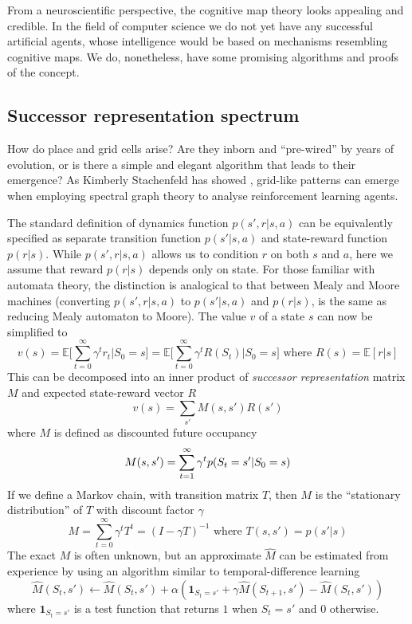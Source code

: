 \documentclass[oneside,english,logo]{amuthesis}
\begin{document}
From a neuroscientific perspective, the cognitive map theory looks appealing and credible. In the field of computer science we do not yet have any successful artificial agents, whose intelligence would be based on mechanisms resembling cognitive maps. We do, nonetheless, have some promising algorithms and proofs of the concept. 


\subsection{Successor representation spectrum}
How do place and grid cells arise? Are they inborn and ``pre-wired'' by years of evolution, or is there a simple and elegant algorithm that leads to their emergence? 
As Kimberly Stachenfeld has showed \cite{hipp_as_cog_map}, grid-like patterns can emerge when employing spectral graph theory to analyse reinforcement learning agents. 

The standard definition of dynamics function $p(s',r|s,a)$ can be equivalently specified as separate transition function $p(s'|s,a)$ and state-reward function $p(r|s)$.
While $p(s',r|s,a)$ allows us to condition $r$ on both $s$ and $a$,  here we assume that reward $p(r|s)$ depends only on state. For those familiar with automata theory, the distinction is analogical to that between Mealy and Moore machines (converting $p(s',r|s,a)$ to $p(s'|s,a)$ and $p(r|s)$, is the same as reducing Mealy automaton to Moore). The value $v$ of a state $s$ can now be simplified to
\[
v(s) = \mathbb{E}\big[\sum_{t=0}^\infty \gamma^t r_t\big\vert S_0=s\big] = \mathbb{E}\big[\sum_{t=0}^\infty \gamma^t R(S_t)\big\vert S_0=s\big]\text{ where }R(s)=\mathbb{E}[r|s]
\]
This can be decomposed into an inner product of \textit{successor representation} matrix $M$ and expected state-reward vector $R$
\[
v(s) = \sum_{s'} M(s,s') R(s')
\]
where $M$ is defined as discounted future occupancy
\[
M(s,s') = \sum_{t=1}^\infty \gamma ^t p(S_t=s'|S_0=s) \\
\]
If we define a Markov chain, with transition matrix $T$, then $M$ is the ``stationary distribution'' of $T$ with discount factor $\gamma$
\[
M = \sum_{t=0}^\infty \gamma^t T^t = (I - \gamma T)^{-1}\text{ where }T(s,s')=p(s'|s)
\]
The exact $M$ is often unknown, but an approximate $\hat{M}$ can be estimated from experience by using an algorithm similar to temporal-difference learning
\[
\hat{M}(S_t,s' )  \leftarrow \hat{M}(S_t,s' ) + \alpha (\boldsymbol{1}_{S_t=s'}+\gamma \hat{M}(S_{t+1},s')-\hat{M}(S_t,s'))
\]
where $\boldsymbol{1}_{S_t=s'}$ is a test function that returns $1$ when $S_t=s'$ and $0$ otherwise.
\end{document}
